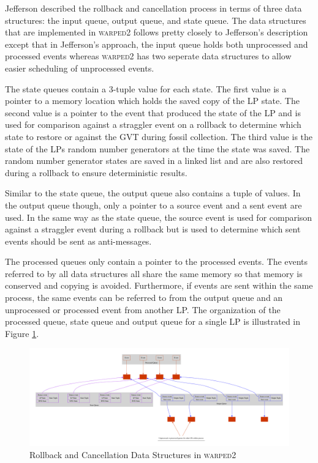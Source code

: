 \documentclass[11pt]{book}
\begin{document}
Jefferson\cite{jefferson-85} described the rollback and cancellation process in terms of three
data structures: the input queue, output queue, and state queue.  The data structures that are
implemented in \textsc{warped2} follows pretty closely to Jefferson's description except that
in Jefferson's approach, the input queue holds both unprocessed and processed events whereas
\textsc{warped2} has two seperate data structures to allow easier scheduling of unprocessed
events.

The state queues contain a 3-tuple value for each state.  The first value is a pointer to a
memory location which holds the saved copy of the LP state.  The second value is a pointer to the
event that produced the state of the LP and is used for comparison against a straggler event
on a rollback to determine which state to restore or against the GVT during fossil collection.
The third value is the state of the LPs random number generators at the time the state was saved.
The random number generator states are saved in a linked list and are also restored during a
rollback to ensure deterministic results.

Similar to the state queue, the output queue also contains a tuple of values.  In the output
queue though, only a pointer to a source event and a sent event are used.  In the same way
as the state queue, the source event is used for comparison against a straggler event during
a rollback but is used to determine which sent events should be sent as anti-messages.

The processed queues only contain a pointer to the processed events.  The events referred to
by all data structures all share the same memory so that memory is conserved and copying is
avoided. Furthermore, if events are sent within the same process, the same events can be referred
to from the output queue and an unprocessed or processed event from another LP.  The organization
of the processed queue, state queue and output queue for a single LP is illustrated in
Figure \ref{rollback_ds}.

\begin{figure}
    \centering
    \includegraphics[width=\textwidth,quiet]{figs/graphviz/rollback_ds.pdf}
    \caption{Rollback and Cancellation Data Structures in \textsc{warped2}}\label{rollback_ds}
\end{figure}
\end{document}
